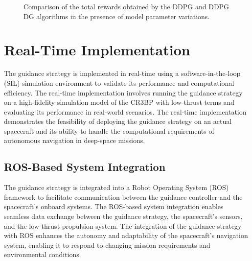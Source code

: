 \documentclass[conference]{IEEEtran}
\begin{document}
\begin{figure}
	  \caption{
		Comparison of the total rewards obtained by the DDPG and DDPG DG algorithms in the presence of model parameter variations.
	}
\end{figure}









\section{Real-Time Implementation}
The guidance strategy is implemented in real-time using a software-in-the-loop (SIL) simulation environment to validate its performance and computational efficiency. The real-time implementation involves running the guidance strategy on a high-fidelity simulation model of the CR3BP with low-thrust terms and evaluating its performance in real-world scenarios. The real-time implementation demonstrates the feasibility of deploying the guidance strategy on an actual spacecraft and its ability to handle the computational requirements of autonomous navigation in deep-space missions.
\subsection{ROS-Based System Integration}
The guidance strategy is integrated into a Robot Operating System (ROS) framework to facilitate communication between the guidance controller and the spacecraft's onboard systems. The ROS-based system integration enables seamless data exchange between the guidance strategy, the spacecraft's sensors, and the low-thrust propulsion system. The integration of the guidance strategy with ROS enhances the autonomy and adaptability of the spacecraft's navigation system, enabling it to respond to changing mission requirements and environmental conditions.
\end{document}
